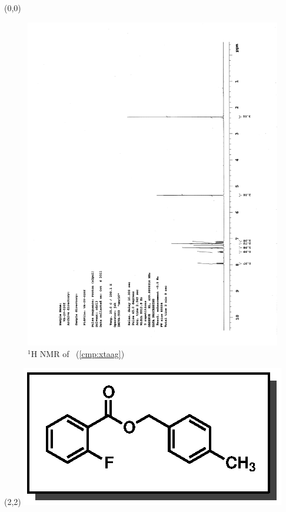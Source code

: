 \begin{textblock}{20}(0,0)
\begin{figure}[htb]
\caption{$^1$H NMR of \CMPxtaag\ (\ref{cmp:xtaag})}
\includegraphics[scale=0.75, trim = 0mm 0mm 0mm 5mm,
clip]{chp_asymmetric/images/nmr/xtaagH}
\vspace{-100pt}
\end{figure}
\end{textblock}
\begin{textblock}{1}(2,2)
\includegraphics[scale=0.8, angle=90]{chp_asymmetric/images/xtaag}
\end{textblock}
